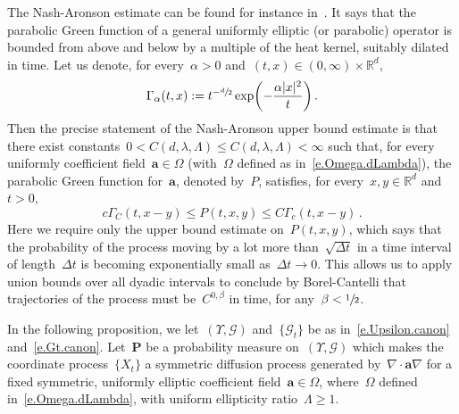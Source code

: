 \documentclass[11pt]{article} %
\numberwithin{equation}{section}
\theoremstyle{definition}
\newcommand*{\Rd}{\ensuremath{\mathbb{R}^d}}
\renewcommand{\a}{\mathbf{a}}
\begin{document}
The Nash-Aronson estimate can be found for instance in~\cite[Lemma E.8]{AKMBook}. It says that the parabolic Green function of a general uniformly elliptic (or parabolic) operator is bounded from above and below by a multiple of the heat kernel, suitably dilated in time. 
Let us denote, for every~$\alpha>0$ and~$(t,x) \in (0,\infty) \times \Rd$,  
\begin{equation}
\label{e.heatkernel}
\Gamma_\alpha (t,x) := t^{-\sfrac d2} \exp\biggl( -\frac{\alpha |x|^2}{t} \biggr)\,.
\end{equation}
Then the precise statement of the Nash-Aronson upper bound estimate is that there exist constants~$0<C(d,\lambda,\Lambda)\leq C(d,\lambda,\Lambda)<\infty$ such that, for every uniformly coefficient field~$\a \in \Omega$ (with~$\Omega$ defined as in~\eqref{e.Omega.dLambda}),
the parabolic Green function for~$\a$, denoted by~$P$, satisfies, for every~$x,y\in\Rd$ and $t>0$, 
\begin{equation}
\label{e.Nash.Aronson}
c \Gamma_{C}(t,x-y) 
\leq
P(t,x,y) 
\leq 
C\Gamma_{c} (t,x-y)
\,.
\end{equation}
Here we require only the upper bound estimate on~$P(t,x,y)$, which says that the probability of the process moving by a lot more than~$\sqrt{\Delta t}$ in a time interval of length~$\Delta t$ is becoming exponentially small as~$\Delta t \to 0$. This allows us to apply union bounds over all dyadic intervals to conclude by Borel-Cantelli that trajectories of the process must be~$C^{0,\beta}$ in time, for any~$\beta < \sfrac12$. 

\smallskip

In the following proposition, we let~$(\Upsilon,\mathcal{G})$  and~$\{ \mathcal{G}_t \}$ be as in~\eqref{e.Upsilon.canon} and~\eqref{e.Gt.canon}.
Let~$\mathbf{P}$ be a probability measure on~$(\Upsilon,\mathcal{G})$ which makes the coordinate process~$\{ X_t\}$ a symmetric diffusion process generated by~$\nabla \cdot \a\nabla$ for a fixed symmetric, uniformly elliptic coefficient field~$\a\in\Omega$, where~$\Omega$ defined in~\eqref{e.Omega.dLambda}, with uniform ellipticity ratio~$\Lambda\geq1$.
\end{document}
